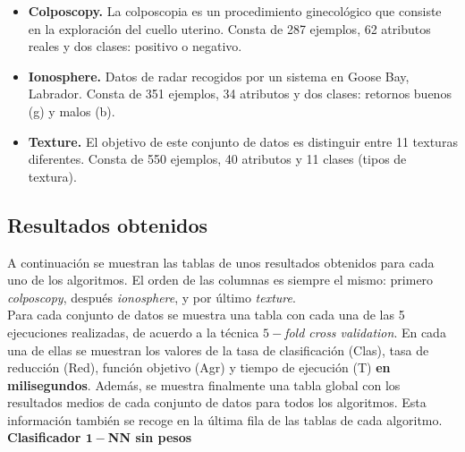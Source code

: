 \documentclass[12pt]{article}
\begin{document}
\begin{itemize}
	\item \textbf{Colposcopy.} La colposcopia es un procedimiento ginecológico que
consiste en la exploración del cuello uterino. Consta de 287 ejemplos, 62 atributos reales y dos clases: positivo o negativo.
    \item \textbf{Ionosphere.} Datos de radar recogidos por un sistema en Goose Bay, Labrador. Consta de 351 ejemplos, 34 atributos y dos clases: retornos buenos (g) y malos (b).
    \item \textbf{Texture.} El objetivo de este conjunto de datos es distinguir entre 11
texturas diferentes. Consta de 550 ejemplos, 40 atributos y 11 clases (tipos de textura).
\end{itemize}

\subsection*{Resultados obtenidos}

A continuación se muestran las tablas de unos resultados obtenidos para cada uno de los algoritmos. El orden de las columnas es siempre el mismo: primero \textit{colposcopy}, después \textit{ionosphere}, y por último \textit{texture}.\\

Para cada conjunto de datos se muestra una tabla con cada una de las 5 ejecuciones realizadas, de acuerdo a la técnica $5-$\textit{fold cross validation}. En cada una de ellas se muestran los valores de la tasa de clasificación (Clas), tasa de reducción (Red), función objetivo (Agr) y tiempo de ejecución (T) \textbf{en milisegundos}. Además, se muestra finalmente una tabla global con los resultados medios de cada conjunto de datos para todos los algoritmos. Esta información también se recoge en la última fila de las tablas de cada algoritmo.\\

\textbf{Clasificador $\boldsymbol{1-}$NN sin pesos}
\end{document}
